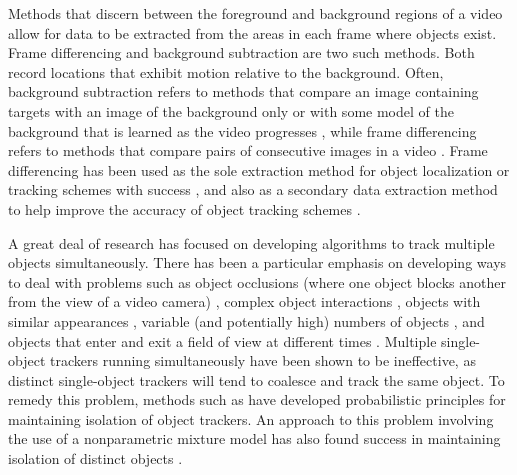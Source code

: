 \documentclass[twocolumn, final]{svjour3}
\begin{document}
Methods that discern between the foreground and background regions of a video allow for data to be extracted from the areas in each frame where objects exist. Frame differencing and background subtraction are two such methods. Both record locations that exhibit motion relative to the background. Often, background subtraction refers to methods that compare an image containing targets with an image of the background only or with some model of the background that is learned as the video progresses \cite{piccardi2004background}, while frame differencing refers to methods that compare pairs of consecutive images in a video \cite{zhang2001segmentation}. Frame differencing has been used as the sole extraction method for object localization or tracking schemes with success \citep{pece_2002, beleznai_2006, chu_2007}, and also as a secondary data extraction method to help improve the accuracy of object tracking schemes \citep{perez_2002}.

A great deal of research has focused on developing algorithms to track multiple objects simultaneously. There has been a particular emphasis on developing ways to deal with problems such as object occlusions (where one object blocks another from the view of a video camera) \cite{senior2006appearance, cucchiara2004probabilistic, zhou2003background}, complex object interactions \cite{khan_2004, mckenna2000tracking, dockstader2001multiple}, objects with similar appearances \cite{maccormick1999probabilistic, jepson_2003}, variable (and potentially high) numbers of objects \cite{reilly2010detection}, and objects that enter and exit a field of view at different times \cite{stauffer2003estimating, nedrich2010learning}. Multiple single-object trackers running simultaneously have been shown to be ineffective, as distinct single-object trackers will tend to coalesce and track the same object. To remedy this problem, methods such as \cite{maccormick1999probabilistic} have developed probabilistic principles for maintaining isolation of object trackers. An approach to this problem involving the use of a nonparametric mixture model has also found success in maintaining isolation of distinct objects \cite{vermaak_2003}.
\end{document}

